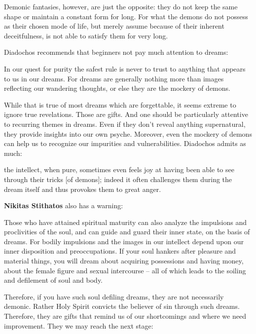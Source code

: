 \begin{quotex}
Demonic fantasies, however, are just the opposite: they do not keep the same shape or maintain a constant form for long. For what the demons do not possess as their chosen mode of life, but merely assume because of their inherent deceitfulness, is not able to satisfy them for very long. 

\end{quotex}
Diadochos recommends that beginners not pay much attention to dreams:

\begin{quotex}
In our quest for purity the safest rule is never to trust to anything that appears to us in our dreams. For dreams are generally nothing more than images reflecting our wandering thoughts, or else they are the mockery of demons. 

\end{quotex}
While that is true of most dreams which are forgettable, it seems extreme to ignore true revelations. Those are gifts. And one should be particularly attentive to recurring themes in dreams. Even if they don't reveal anything supernatural, they provide insights into our own psyche. Moreover, even the mockery of demons can help us to recognize our impurities and vulnerabilities. Diadochos admits as much:

\begin{quotex}
the intellect, when pure, sometimes even feels joy at having been able to see through their tricks [of demons]; indeed it often challenges them during the dream itself and thus provokes them to great anger. 

\end{quotex}
\textbf{Nikitas Stithatos} also has a warning:

\begin{quotex}
Those who have attained spiritual maturity can also analyze the impulsions and proclivities of the soul, and can guide and guard their inner state, on the basis of dreams. For bodily impulsions and the images in our intellect depend upon our inner disposition and preoccupations. If your soul hankers after pleasure and material things, you will dream about acquiring possessions and having money, about the female figure and sexual intercourse – all of which leads to the soiling and defilement of soul and body. 

\end{quotex}
Therefore, if you have such soul defiling dreams, they are not necessarily demonic. Rather Holy Spirit convicts the believer of sin through such dreams. Therefore, they are gifts that remind us of our shortcomings and where we need improvement. They we may reach the next stage:

